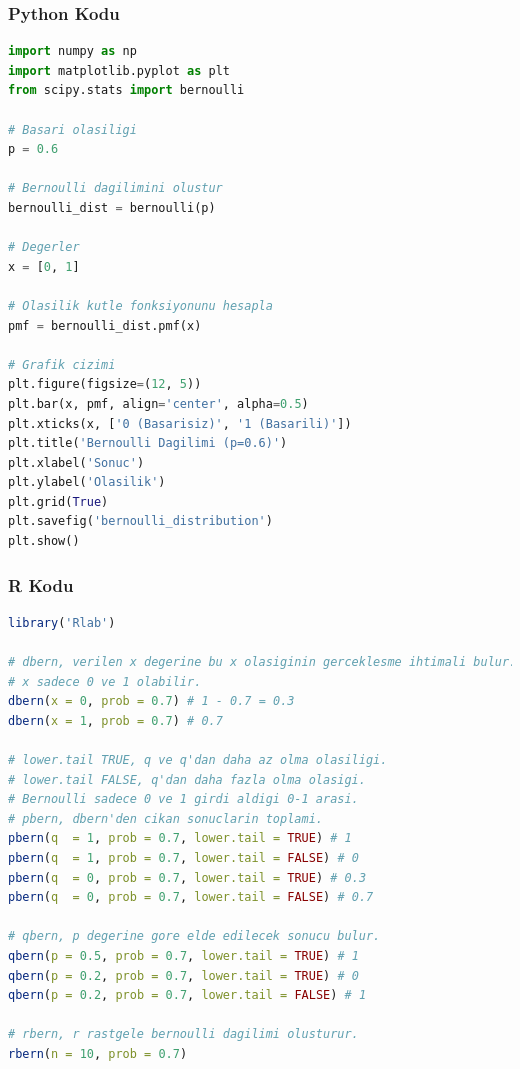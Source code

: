 \subsubsection{Python Kodu}

\begin{lstlisting}[language=Python]
import numpy as np
import matplotlib.pyplot as plt
from scipy.stats import bernoulli

# Basari olasiligi
p = 0.6

# Bernoulli dagilimini olustur
bernoulli_dist = bernoulli(p)

# Degerler
x = [0, 1]

# Olasilik kutle fonksiyonunu hesapla
pmf = bernoulli_dist.pmf(x)

# Grafik cizimi
plt.figure(figsize=(12, 5))
plt.bar(x, pmf, align='center', alpha=0.5)
plt.xticks(x, ['0 (Basarisiz)', '1 (Basarili)'])
plt.title('Bernoulli Dagilimi (p=0.6)')
plt.xlabel('Sonuc')
plt.ylabel('Olasilik')
plt.grid(True)
plt.savefig('bernoulli_distribution')
plt.show()
\end{lstlisting}

\subsubsection{R Kodu}

\begin{lstlisting}[language=R]
library('Rlab')

# dbern, verilen x degerine bu x olasiginin gerceklesme ihtimali bulur.
# x sadece 0 ve 1 olabilir.
dbern(x = 0, prob = 0.7) # 1 - 0.7 = 0.3
dbern(x = 1, prob = 0.7) # 0.7

# lower.tail TRUE, q ve q'dan daha az olma olasiligi.
# lower.tail FALSE, q'dan daha fazla olma olasigi.
# Bernoulli sadece 0 ve 1 girdi aldigi 0-1 arasi.
# pbern, dbern'den cikan sonuclarin toplami.
pbern(q  = 1, prob = 0.7, lower.tail = TRUE) # 1
pbern(q  = 1, prob = 0.7, lower.tail = FALSE) # 0
pbern(q  = 0, prob = 0.7, lower.tail = TRUE) # 0.3
pbern(q  = 0, prob = 0.7, lower.tail = FALSE) # 0.7

# qbern, p degerine gore elde edilecek sonucu bulur.
qbern(p = 0.5, prob = 0.7, lower.tail = TRUE) # 1
qbern(p = 0.2, prob = 0.7, lower.tail = TRUE) # 0
qbern(p = 0.2, prob = 0.7, lower.tail = FALSE) # 1

# rbern, r rastgele bernoulli dagilimi olusturur.
rbern(n = 10, prob = 0.7)
\end{lstlisting}

\newpage

